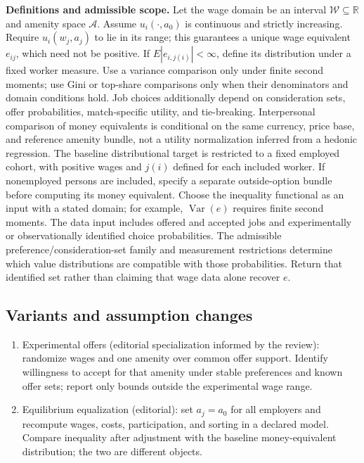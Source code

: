 \documentclass[11pt,a4paper]{article}
\begin{document}
\textbf{Definitions and admissible scope.} Let the wage domain be an interval \(\mathcal W\subseteq\mathbb R\) and amenity space \(\mathcal A\). Assume \(u_i(\cdot,a_0)\) is continuous and strictly increasing. Require \(u_i(w_j,a_j)\) to lie in its range; this guarantees a unique wage equivalent \(e_{ij}\), which need not be positive. If \(E|e_{i,j(i)}|<\infty\), define its distribution under a fixed worker measure. Use a variance comparison only under finite second moments; use Gini or top-share comparisons only when their denominators and domain conditions hold. Job choices additionally depend on consideration sets, offer probabilities, match-specific utility, and tie-breaking. Interpersonal comparison of money equivalents is conditional on the same currency, price base, and reference amenity bundle, not a utility normalization inferred from a hedonic regression. The baseline distributional target is restricted to a fixed employed cohort, with positive wages and \(j(i)\) defined for each included worker. If nonemployed persons are included, specify a separate outside-option bundle before computing its money equivalent. Choose the inequality functional as an input with a stated domain; for example, \(\operatorname{Var}(e)\) requires finite second moments. The data input includes offered and accepted jobs and experimentally or observationally identified choice probabilities. The admissible preference/consideration-set family and measurement restrictions determine which value distributions are compatible with those probabilities. Return that identified set rather than claiming that wage data alone recover \(e\).
\subsection*{Variants and assumption changes}
\begin{enumerate}
\item Experimental offers (editorial specialization informed by the review): randomize wages and one amenity over common offer support. Identify willingness to accept for that amenity under stable preferences and known offer sets; report only bounds outside the experimental wage range.
\item Equilibrium equalization (editorial): set \(a_j=a_0\) for all employers and recompute wages, costs, participation, and sorting in a declared model. Compare inequality after adjustment with the baseline money-equivalent distribution; the two are different objects.
\end{enumerate}
\end{document}
